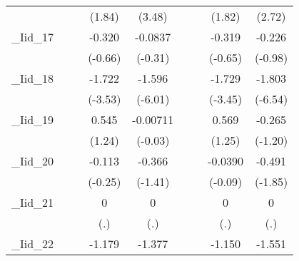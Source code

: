 {\begin{tabular}{l*{8}{c}}
            &                     &                     &      (1.84)         &      (3.48)         &                     &                     &      (1.82)         &      (2.72)         \\
[1em]
\_Iid\_17     &                     &                     &      -0.320         &     -0.0837         &                     &                     &      -0.319         &      -0.226         \\
            &                     &                     &     (-0.66)         &     (-0.31)         &                     &                     &     (-0.65)         &     (-0.98)         \\
[1em]
\_Iid\_18     &                     &                     &      -1.722\sym{***}&      -1.596\sym{***}&                     &                     &      -1.729\sym{***}&      -1.803\sym{***}\\
            &                     &                     &     (-3.53)         &     (-6.01)         &                     &                     &     (-3.45)         &     (-6.54)         \\
[1em]
\_Iid\_19     &                     &                     &       0.545         &    -0.00711         &                     &                     &       0.569         &      -0.265         \\
            &                     &                     &      (1.24)         &     (-0.03)         &                     &                     &      (1.25)         &     (-1.20)         \\
[1em]
\_Iid\_20     &                     &                     &      -0.113         &      -0.366         &                     &                     &     -0.0390         &      -0.491         \\
            &                     &                     &     (-0.25)         &     (-1.41)         &                     &                     &     (-0.09)         &     (-1.85)         \\
[1em]
\_Iid\_21     &                     &                     &           0         &           0         &                     &                     &           0         &           0         \\
            &                     &                     &         (.)         &         (.)         &                     &                     &         (.)         &         (.)         \\
[1em]
\_Iid\_22     &                     &                     &      -1.179\sym{**} &      -1.377\sym{***}&                     &                     &      -1.150\sym{**} &      -1.551\sym{***}\\

\end{tabular}}
